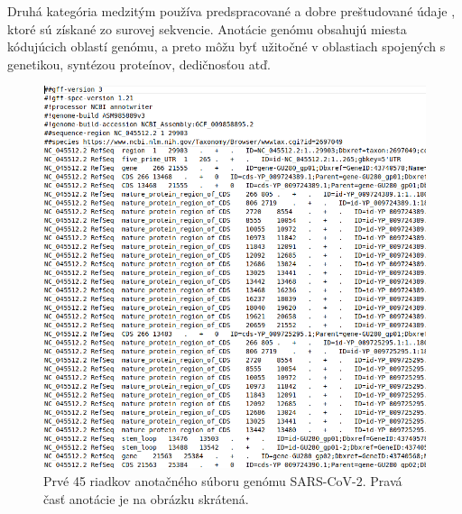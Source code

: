 Druhá kategória medzitým používa predspracované a dobre preštudované údaje \cites{gff}, ktoré sú získané zo surovej sekvencie.
Anotácie genómu obsahujú miesta kódujúcich oblastí genómu, a preto môžu byť užitočné v oblastiach spojených s genetikou, syntézou proteínov, dedičnosťou atď.
\begin{figure}[!ht]
	\centering
	\includegraphics[width=.8\textwidth]{figures/gff3.png}
	\caption{Prvé 45 riadkov anotačného súboru genómu SARS-CoV-2. Pravá časť anotácie je na obrázku skrátená.\label{o:latex_friendly_zone}}
\end{figure}

